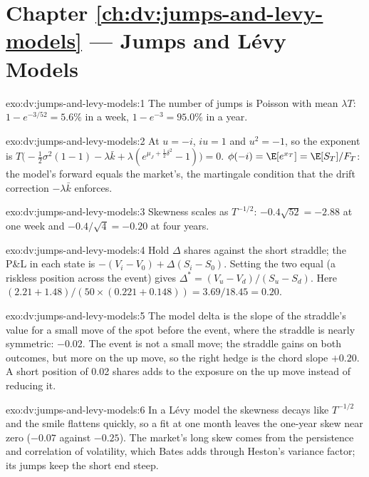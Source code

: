 \section*{Chapter \ref{ch:dv:jumps-and-levy-models} --- Jumps and Lévy Models}

\begin{solution}{exo:dv:jumps-and-levy-models:1}
The number of jumps is Poisson with mean $\lambda T$: $1-e^{-3/52}=5.6\%$ in a week, $1-e^{-3}=95.0\%$ in a year.
\end{solution}

\begin{solution}{exo:dv:jumps-and-levy-models:2}
At $u=-i$, $iu=1$ and $u^2=-1$, so the exponent is
$T\bigl(-\frac12\sigma^2(1-1)-\lambda\bar k+\lambda(e^{\mu_J+\frac12\delta^2}-1)\bigr)=0$. $\phi(-i)=\E[e^{x_T}]=\E[S_T]/F_T$:
the model's forward equals the market's, the martingale condition that the drift correction $-\lambda\bar k$
enforces.
\end{solution}

\begin{solution}{exo:dv:jumps-and-levy-models:3}
Skewness scales as $T^{-1/2}$: $-0.4\sqrt{52}=-2.88$ at one week and $-0.4/\sqrt4=-0.20$ at four years.
\end{solution}

\begin{solution}{exo:dv:jumps-and-levy-models:4}
Hold $\Delta$ shares against the short straddle; the P\&L in each state is $-(V_i-V_0)+\Delta(S_i-S_0)$. Setting
the two equal (a riskless position across the event) gives $\Delta^*=(V_u-V_d)/(S_u-S_d)$. Here
$(2.21+1.48)/(50\times(0.221+0.148))=3.69/18.45=0.20$.
\end{solution}

\begin{solution}{exo:dv:jumps-and-levy-models:5}
The model delta is the slope of the straddle's value for a small move of the spot before the event, where the
straddle is nearly symmetric: $-0.02$. The event is not a small move; the straddle gains on both outcomes, but
more on the up move, so the right hedge is the chord slope $+0.20$. A short position of 0.02 shares adds to the
exposure on the up move instead of reducing it.
\end{solution}

\begin{solution}{exo:dv:jumps-and-levy-models:6}
In a Lévy model the skewness decays like $T^{-1/2}$ and the smile flattens quickly, so a fit at one month leaves
the one-year skew near zero ($-0.07$ against $-0.25$). The market's long skew comes from the persistence and
correlation of volatility, which Bates adds through Heston's variance factor; its jumps keep the short end steep.
\end{solution}

